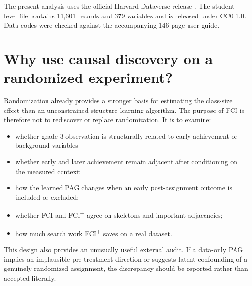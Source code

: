 \documentclass[11pt,a4paper,oneside]{report}
\newcommand{\FCIplus}{FCI\textsuperscript{+}}
\begin{document}
The present analysis uses the official Harvard Dataverse release
\citep{achilles2008star}. The student-level file contains 11,601 records and
379 variables and is released under CC0 1.0. Data codes were checked against
the accompanying 146-page user guide.

\section{Why use causal discovery on a randomized experiment?}

Randomization already provides a stronger basis for estimating the class-size
effect than an unconstrained structure-learning algorithm. The purpose of FCI
is therefore not to rediscover or replace randomization. It is to examine:

\begin{itemize}[leftmargin=2em]
  \item whether grade-3 observation is structurally related to early
        achievement or background variables;
  \item whether early and later achievement remain adjacent after conditioning
        on the measured context;
  \item how the learned PAG changes when an early post-assignment outcome is
        included or excluded;
  \item whether FCI and \FCIplus{} agree on skeletons and important
        adjacencies;
  \item how much search work \FCIplus{} saves on a real dataset.
\end{itemize}

This design also provides an unusually useful external audit. If a data-only
PAG implies an implausible pre-treatment direction or suggests latent
confounding of a genuinely randomized assignment, the discrepancy should be
reported rather than accepted literally.
\end{document}
